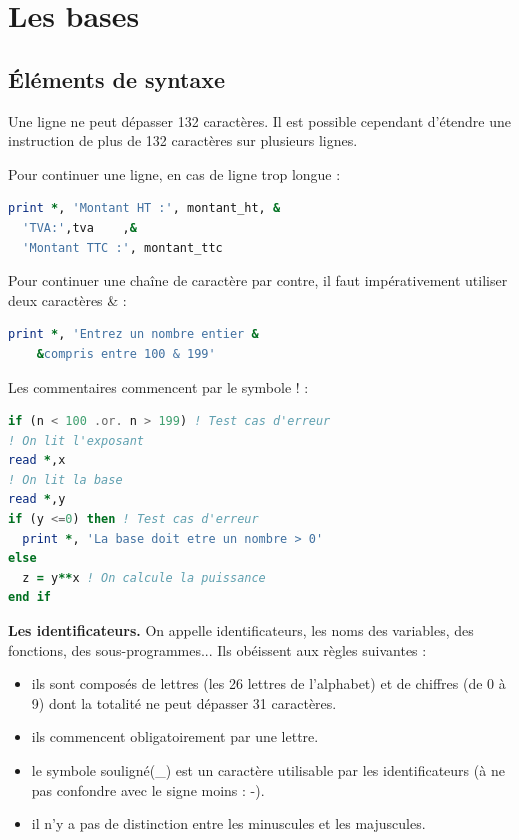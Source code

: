 \documentclass[a4paper,twoside]{article}
\begin{document}
\section{Les bases}
\subsection{Éléments de syntaxe}
Une ligne ne peut dépasser 132 caractères. Il est possible cependant d'étendre une instruction de plus de 132 caractères sur plusieurs lignes.

Pour continuer une ligne, en cas de ligne trop longue : 
\begin{lstlisting}[language=Fortran]
print *, 'Montant HT :', montant_ht, & 
  'TVA:',tva	,&
  'Montant TTC :', montant_ttc
\end{lstlisting}

\bigskip

Pour continuer une chaîne de caractère par contre, il faut impérativement utiliser deux caractères \og \& \fg : 
\begin{lstlisting}[language=Fortran]
print *, 'Entrez un nombre entier & 
	&compris entre 100 & 199'
\end{lstlisting}

\bigskip

Les commentaires commencent par le symbole \og ! \fg : 
\begin{lstlisting}[language=Fortran]
if (n < 100 .or. n > 199) ! Test cas d'erreur
! On lit l'exposant
read *,x 
! On lit la base
read *,y 
if (y <=0) then ! Test cas d'erreur 
  print *, 'La base doit etre un nombre > 0'
else 
  z = y**x ! On calcule la puissance
end if
\end{lstlisting}

\bigskip

\textbf{Les identificateurs.} On appelle identificateurs, les noms des variables, des fonctions, des
sous-programmes... Ils obéissent aux règles suivantes :
\begin{itemize}
\item ils sont composés de lettres (les 26 lettres de l'alphabet) et de chiffres (de 0 à 9) dont la totalité ne peut dépasser 31 caractères.
\item ils commencent obligatoirement par une lettre.
\item le symbole \og souligné\fg (\_) est un caractère utilisable par les identificateurs (à ne pas confondre avec le signe moins : \og -\fg).
\item il n'y a pas de distinction entre les minuscules et les majuscules.
\end{itemize}
\end{document}
